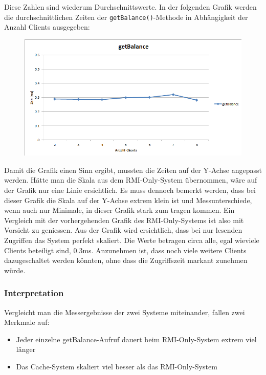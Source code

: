 Diese Zahlen sind wiederum Durchschnittswerte.  In der folgenden Grafik werden die durchschnittlichen Zeiten der \texttt{getBalance()}-Methode in Abhängigkeit der Anzahl Clients ausgegeben:

\begin{figure}[H]
\begin{center}
\includegraphics[scale=0.6]{images_MessErgebnisse/getBalance_03ms.png}
\end{center}
\end{figure}

Damit die Grafik einen Sinn ergibt, mussten die Zeiten auf der Y-Achse angepasst werden. Hätte man die Skala aus dem RMI-Only-System übernommen, wäre auf der Grafik nur eine Linie ersichtlich. Es muss dennoch bemerkt werden, dass bei dieser Grafik die Skala auf der Y-Achse extrem klein ist und Messunterschiede, wenn auch nur Minimale, in dieser Grafik stark zum tragen kommen. Ein Vergleich mit der vorhergehenden Grafik des RMI-Only-Systems ist also mit Vorsicht zu geniessen.
\newline Aus der Grafik wird ersichtlich, dass bei nur lesenden Zugriffen das System perfekt skaliert. Die Werte betragen circa alle, egal wieviele Clients beteiligt sind, 0.3ms. Anzunehmen ist, dass noch viele weitere Clients dazugeschaltet werden könnten, ohne dass die Zugriffszeit markant zunehmen würde.


\subsubsection{Interpretation}

Vergleicht man die Messergebnisse der zwei Systeme miteinander, fallen zwei Merkmale auf:
\begin{itemize}
\item Jeder einzelne getBalance-Aufruf dauert beim RMI-Only-System extrem viel länger
\item Das Cache-System skaliert viel besser als das RMI-Only-System
\end{itemize}


